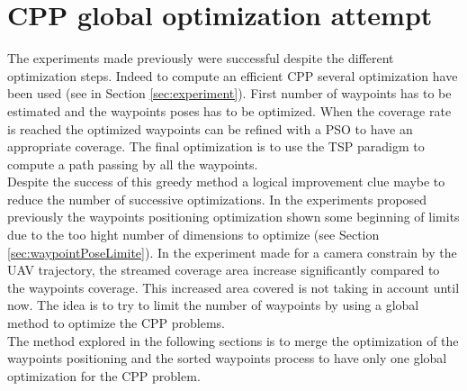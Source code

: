 \section{CPP global optimization attempt}

The experiments made previously were successful despite the different optimization steps. Indeed to compute an efficient CPP several optimization have been used (see in Section \ref{sec:experiment}). %
First number of waypoints has to be estimated and the waypoints poses has to be optimized. When the coverage rate is reached the optimized waypoints can be refined with a PSO to have an appropriate coverage. The final optimization is to use the TSP paradigm to compute a path passing by all the waypoints.%
\\Despite the success of this greedy method a logical improvement clue maybe to reduce the number of successive optimizations. In the experiments proposed previously the waypoints positioning optimization shown some beginning of limits due to the too hight number of dimensions to optimize (see Section \ref{sec:waypointPoseLimite}). 
In the experiment made for a camera constrain by the UAV trajectory, the streamed coverage area increase significantly compared to the waypoints coverage. This increased area covered is not taking in account until now. The idea is to try to limit the number of waypoints by using a global method to optimize the CPP problems.\\
The method explored in the following sections is to merge the optimization of the waypoints positioning and the sorted waypoints process to have only one global optimization for the CPP problem. 
 
